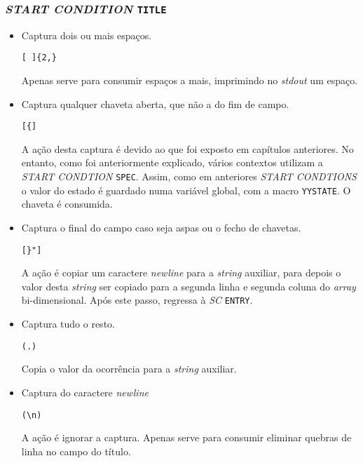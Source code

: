 \subsubsection{\emph{START CONDITION} \texttt{TITLE}}

\begin{itemize}
\item Captura dois ou mais espaços.
\begin{verbatim}
[ ]{2,}
\end{verbatim}

Apenas serve para consumir espaços a mais, imprimindo no \emph{stdout} um espaço.

\item Captura qualquer chaveta aberta, que não a do fim de campo.
\begin{verbatim}
[{]
\end{verbatim}

A ação desta captura é devido ao que foi exposto em capítulos anteriores. No
entanto, como foi anteriormente explicado, vários contextos utilizam
a \emph{START CONDTION} \texttt{SPEC}. Assim, como em anteriores \emph{START
CONDTIONS} o valor do estado é guardado numa variável global, com a macro
\texttt{YYSTATE}. O chaveta é consumida.

\item Captura o final do campo caso seja aspas ou o fecho de chavetas.
\begin{verbatim}
[}"] 
\end{verbatim}
A ação é copiar um caractere \emph{newline} para a \emph{string} auxiliar, para
depois o valor desta \emph{string} ser copiado para a segunda linha e segunda
coluna do \emph{array} bi-dimensional. Após este passo, regressa à \emph{SC}
\texttt{ENTRY}.


\item Captura tudo o resto.
\begin{verbatim}
(.)
\end{verbatim}

Copia o valor da ocorrência para a \emph{string} auxiliar.

\item Captura do caractere \emph{newline}
\begin{verbatim}
(\n)
\end{verbatim}

A ação é ignorar a captura. Apenas serve para consumir eliminar quebras de linha no
campo do título.


\end{itemize}

